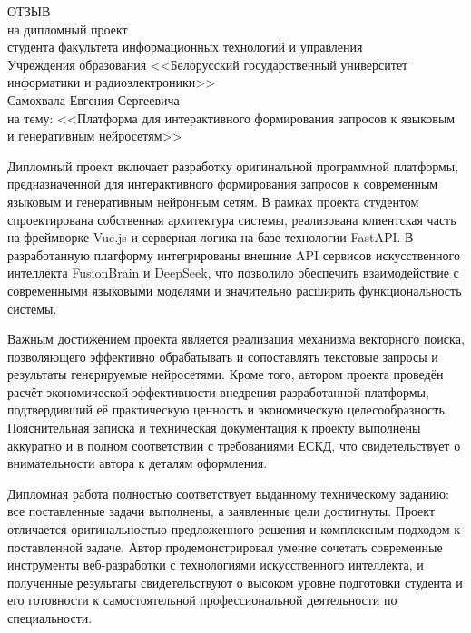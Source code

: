 \documentclass[12pt,a4paper]{article}
\begin{document}
\thispagestyle{empty}

\begin{singlespace}
{\small
  \begin{center}
    \begin{minipage}{0.8\textwidth}
      \begin{center}
        {\normalsize ОТЗЫВ}\\[1em]
        на дипломный проект\\студента факультета информационных технологий 
        и управления\\Учреждения образования <<Белорусский государственный университет информатики и радиоэлектроники>>\\
        Самохвала Евгения Сергеевича\\
        на тему: <<Платформа для интерактивного формирования запросов к языковым и генеративным нейросетям>>
      \end{center}
    \end{minipage}
  \end{center}

Дипломный проект включает разработку оригинальной программной платформы, предназначенной для интерактивного формирования запросов к современным языковым и генеративным нейронным сетям. В рамках проекта студентом спроектирована собственная архитектура системы, реализована клиентская часть на фреймворке Vue.js и серверная логика на базе технологии FastAPI. В разработанную платформу интегрированы внешние API сервисов искусственного интеллекта FusionBrain и DeepSeek, что позволило обеспечить взаимодействие с современными языковыми моделями и значительно расширить функциональность системы.

Важным достижением проекта является реализация механизма векторного поиска, позволяющего эффективно обрабатывать и сопоставлять текстовые запросы и результаты генерируемые нейросетями. Кроме того, автором проекта проведён расчёт экономической эффективности внедрения разработанной платформы, подтвердивший её практическую ценность и экономическую целесообразность. Пояснительная записка и техническая документация к проекту выполнены аккуратно и в полном соответствии с требованиями ЕСКД, что свидетельствует о внимательности автора к деталям оформления.

Дипломная работа полностью соответствует выданному техническому заданию: все поставленные задачи выполнены, а заявленные цели достигнуты. Проект отличается оригинальностью предложенного решения и комплексным подходом к поставленной задаче. Автор продемонстрировал умение сочетать современные инструменты веб-разработки с технологиями искусственного интеллекта, и полученные результаты свидетельствуют о высоком уровне подготовки студента и его готовности к самостоятельной профессиональной деятельности по специальности.

}
\end{singlespace}
\end{document}
